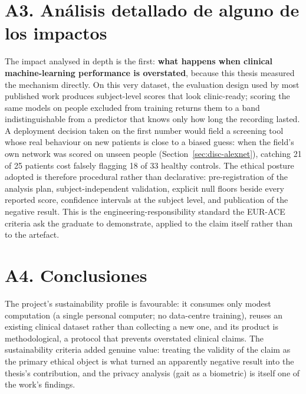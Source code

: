 \section*{A3. An\'alisis detallado de alguno de los impactos}
\normalsize{The impact analysed in depth is the first: \textbf{what happens
when clinical machine-learning performance is overstated}, because this
thesis measured the mechanism directly. On this very dataset, the
evaluation design used by most published work produces subject-level
scores that look clinic-ready; scoring the same models on people excluded
from training returns them to a band indistinguishable from a predictor
that knows only how long the recording lasted. A deployment decision taken
on the first number would field a screening tool whose real behaviour on
new patients is close to a biased guess: when the field's own network was
scored on unseen people (Section~\ref{sec:disc-alexnet}), catching
21 of 25 patients cost falsely flagging 18 of 33 healthy controls. The
ethical posture adopted is therefore procedural rather than declarative:
pre-registration of the analysis plan, subject-independent validation,
explicit null floors beside every reported score, confidence intervals at
the subject level, and publication of the negative result. This is the
engineering-responsibility standard the EUR-ACE criteria ask the graduate
to demonstrate, applied to the claim itself rather than to the artefact.}
\vspace{0.3cm}

\section*{A4. Conclusiones}
\normalsize{The project's sustainability profile is favourable: it consumes
only modest computation (a single personal computer; no data-centre
training), reuses an existing clinical dataset rather than collecting a new
one, and its product is methodological, a protocol that prevents overstated
clinical claims. The sustainability criteria added genuine value: treating
the validity of the claim as the primary ethical object is what turned an
apparently negative result into the thesis's contribution, and the privacy
analysis (gait as a biometric) is itself one of the work's findings.}
